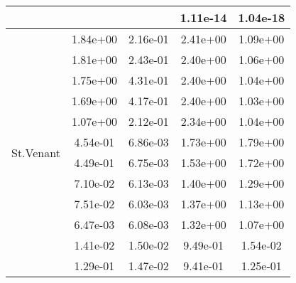 \begin{table}
\begin{tabular}{c|cc|cc|}
\multicolumn{1}{|c|}{} & \multicolumn{1}{|c|}{} & \multicolumn{1}{|c|}{} & \multicolumn{1}{|c|}{  1.11e-14} & \multicolumn{1}{|c|}{  1.04e-18} \\ 
\hline 
\multicolumn{1}{|c|}{\multirow{61}{*}{St.Venant}} &\multicolumn{1}{|c|}{  1.84e+00} & \multicolumn{1}{|c|}{  2.16e-01} & \multicolumn{1}{|c|}{  2.41e+00} & \multicolumn{1}{|c|}{  1.09e+00} \\ 
\multicolumn{1}{|c|}{} & \multicolumn{1}{|c|}{  1.81e+00} & \multicolumn{1}{|c|}{  2.43e-01} & \multicolumn{1}{|c|}{  2.40e+00} & \multicolumn{1}{|c|}{  1.06e+00} \\ 
\multicolumn{1}{|c|}{} & \multicolumn{1}{|c|}{  1.75e+00} & \multicolumn{1}{|c|}{  4.31e-01} & \multicolumn{1}{|c|}{  2.40e+00} & \multicolumn{1}{|c|}{  1.04e+00} \\ 
\multicolumn{1}{|c|}{} & \multicolumn{1}{|c|}{  1.69e+00} & \multicolumn{1}{|c|}{  4.17e-01} & \multicolumn{1}{|c|}{  2.40e+00} & \multicolumn{1}{|c|}{  1.03e+00} \\ 
\multicolumn{1}{|c|}{} & \multicolumn{1}{|c|}{  1.07e+00} & \multicolumn{1}{|c|}{  2.12e-01} & \multicolumn{1}{|c|}{  2.34e+00} & \multicolumn{1}{|c|}{  1.04e+00} \\ 
\multicolumn{1}{|c|}{} & \multicolumn{1}{|c|}{  4.54e-01} & \multicolumn{1}{|c|}{  6.86e-03} & \multicolumn{1}{|c|}{  1.73e+00} & \multicolumn{1}{|c|}{  1.79e+00} \\ 
\multicolumn{1}{|c|}{} & \multicolumn{1}{|c|}{  4.49e-01} & \multicolumn{1}{|c|}{  6.75e-03} & \multicolumn{1}{|c|}{  1.53e+00} & \multicolumn{1}{|c|}{  1.72e+00} \\ 
\multicolumn{1}{|c|}{} & \multicolumn{1}{|c|}{  7.10e-02} & \multicolumn{1}{|c|}{  6.13e-03} & \multicolumn{1}{|c|}{  1.40e+00} & \multicolumn{1}{|c|}{  1.29e+00} \\ 
\multicolumn{1}{|c|}{} & \multicolumn{1}{|c|}{  7.51e-02} & \multicolumn{1}{|c|}{  6.03e-03} & \multicolumn{1}{|c|}{  1.37e+00} & \multicolumn{1}{|c|}{  1.13e+00} \\ 
\multicolumn{1}{|c|}{} & \multicolumn{1}{|c|}{  6.47e-03} & \multicolumn{1}{|c|}{  6.08e-03} & \multicolumn{1}{|c|}{  1.32e+00} & \multicolumn{1}{|c|}{  1.07e+00} \\ 
\multicolumn{1}{|c|}{} & \multicolumn{1}{|c|}{  1.41e-02} & \multicolumn{1}{|c|}{  1.50e-02} & \multicolumn{1}{|c|}{  9.49e-01} & \multicolumn{1}{|c|}{  1.54e-02} \\ 
\multicolumn{1}{|c|}{} & \multicolumn{1}{|c|}{  1.29e-01} & \multicolumn{1}{|c|}{  1.47e-02} & \multicolumn{1}{|c|}{  9.41e-01} & \multicolumn{1}{|c|}{  1.25e-01} \\ 

\end{tabular}
\end{table}
